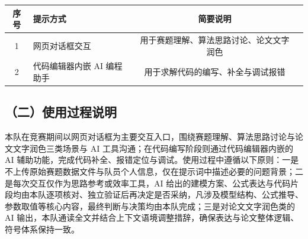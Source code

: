 \documentclass[12pt, a4paper, scheme=chinese, fontset=windows]{ctexart}
\begin{document}
\begin{longtable}{cp{3.6cm}cp{5cm}}
\toprule
序号 & 提示方式 & 简要说明 \\
\midrule
\endhead
1 & 网页对话框交互 &  用于赛题理解、算法思路讨论、论文文字润色 \\
2 & 代码编辑器内嵌 AI 编程助手 &  用于求解代码的编写、补全与调试报错 \\
\bottomrule
\end{longtable}

\subsection*{（二）使用过程说明}

本队在竞赛期间以网页对话框为主要交互入口，围绕赛题理解、算法思路讨论与论文文字润色三类场景与 AI 工具沟通；在代码编写阶段则通过代码编辑器内嵌的 AI 辅助功能，完成代码补全、报错定位与调试。使用过程中遵循以下原则：一是不上传原始赛题数据文件与队员个人信息，仅在提示词中描述必要的问题背景；二是每次交互仅作为思路参考或效率工具，AI 给出的建模方案、公式表达与代码片段均由本队逐项核对、独立验证后再决定是否采纳，凡涉及模型结构、公式推导、参数取值等核心内容，最终判断与决策均由本队完成；三是对论文文字润色类的 AI 输出，本队通读全文并结合上下文语境调整措辞，确保表达与论文整体逻辑、符号体系保持一致。
\end{document}
